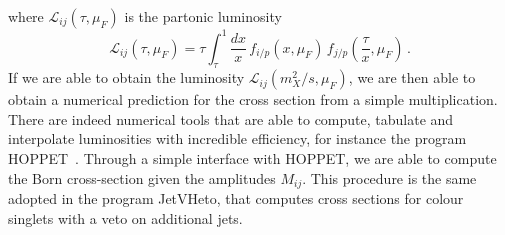 \documentclass[12pt,a4wide]{article}
\begin{document}
where $\mathcal{L}_{ij}\left(\tau,\mu_F\right)$ is the partonic luminosity
\begin{equation}
  \label{eq:hoppet-lumi}
  \mathcal{L}_{ij}\left(\tau,\mu_F\right) = \tau \int_\tau^1 \frac{dx}{x}\, f_{i/p}(x,\mu_F)\, f_{j/p}\left(\frac{\tau}{x},\mu_F\right)\,.
\end{equation}
If we are able to obtain the luminosity
$\mathcal{L}_{ij}\left(m_X^2/s,\mu_F\right)$, we are then able to
obtain a numerical prediction for the cross section from a simple
multiplication. There are indeed numerical tools that are able to
compute, tabulate and interpolate luminosities with incredible
efficiency, for instance the program HOPPET~. Through a simple
interface with HOPPET, we are able to compute the Born cross-section
given the amplitudes $M_{ij}$. This procedure is the same adopted in
the program JetVHeto, that computes cross sections for colour singlets
with a veto on additional jets.
\end{document}

